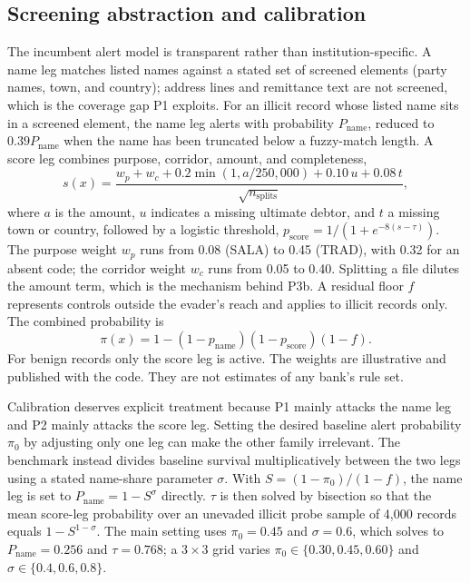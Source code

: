 \documentclass[conference]{IEEEtran}
\begin{document}
\subsection{Screening abstraction and calibration}
The incumbent alert model is transparent rather than institution-specific. A
name leg matches listed names against a stated set of screened elements
(party names, town, and country); address lines and remittance text are not
screened, which is the coverage gap P1 exploits. For an illicit record whose
listed name sits in a screened element, the name leg alerts with probability
$P_{\mathrm{name}}$, reduced to $0.39P_{\mathrm{name}}$ when the name has been
truncated below a fuzzy-match length. A score leg combines purpose, corridor,
amount, and completeness,
\begin{equation}
 s(x)=\frac{w_p+w_c+0.2\min(1,a/250{,}000)+0.10\,u+0.08\,t}
 {\sqrt{n_{\mathrm{splits}}}},
 \label{eq:score}
\end{equation}
where $a$ is the amount, $u$ indicates a missing ultimate debtor, and $t$ a
missing town or country, followed by a logistic threshold,
$p_{\mathrm{score}}=1/(1+e^{-8(s-\tau)})$.
The purpose weight $w_p$ runs from 0.08 (SALA) to 0.45 (TRAD), with 0.32 for
an absent code; the corridor weight $w_c$ runs from 0.05 to 0.40. Splitting a
file dilutes the amount term, which is the mechanism behind P3b. A residual
floor $f$ represents controls outside the evader's reach and applies to
illicit records only. The combined probability is
\begin{equation}
 \pi(x)=1-(1-p_{\mathrm{name}})(1-p_{\mathrm{score}})(1-f).
 \label{eq:screening}
\end{equation}
For benign records only the score leg is active. The weights are illustrative
and published with the code. They are not estimates of any bank's rule set.

Calibration deserves explicit treatment because P1 mainly attacks the name
leg and P2 mainly attacks the score leg. Setting the desired baseline alert
probability $\pi_0$ by adjusting only one leg can make the other family
irrelevant. The benchmark instead divides baseline survival multiplicatively
between the two legs using a stated name-share parameter $\sigma$. With
$S=(1-\pi_0)/(1-f)$, the name leg is set to $P_{\mathrm{name}}=1-S^{\sigma}$
directly. $\tau$ is then solved by bisection so that the mean score-leg
probability over an unevaded illicit probe sample of 4,000 records equals
$1-S^{1-\sigma}$. The main setting uses $\pi_0=0.45$ and $\sigma=0.6$, which
solves to $P_{\mathrm{name}}=0.256$ and $\tau=0.768$; a $3\times3$ grid
varies $\pi_0\in\{0.30,0.45,0.60\}$ and $\sigma\in\{0.4,0.6,0.8\}$.
\end{document}
